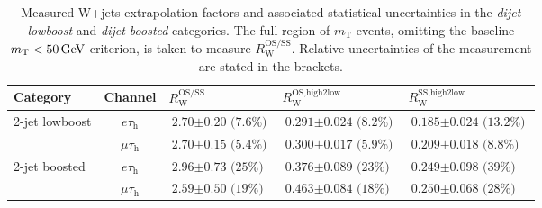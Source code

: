 \begin{table}[h!]
    \centering
    \caption[Measured W+jets extrapolation factors and associated statistical uncertainties in the \textit{dijet lowboost} and \textit{dijet boosted} categories.]{Measured W+jets extrapolation factors and associated statistical uncertainties in the \textit{dijet lowboost} and \textit{dijet boosted} categories. The full region of $m_\text{T}$ events, omitting the baseline $m_\text{T}<\text{50\,GeV}$ criterion, is taken to measure $R_\text{W}^\text{OS/SS}$.
    Relative uncertainties of the measurement are stated in the brackets.}\label{tab:etmt_wj:wj_factors_2jet}
    \begin{tabular}{lclll}
        \toprule
         Category                       & Channel    & $R_\text{W}^\text{OS/SS}$          & $R_\text{W}^\text{OS,high2low}$ & $R_\text{W}^\text{SS,high2low}$   \\ \hline
        \multirow{2}{*}{2-jet lowboost} & $e\tau_\text{h}$   & {\footnotesize $\text{2.70} \pm \text{0.20 (7.6\%)}$}  &  {\footnotesize $\text{0.291} \pm \text{0.024 (8.2\%)}$ }       &{\footnotesize $\text{0.185} \pm \text{0.024 (13.2\%)}$}    \\
                                        & $\mu\tau_\text{h}$ & {\footnotesize $\text{2.70} \pm \text{0.15 (5.4\%)}$}  &  {\footnotesize $\text{0.300} \pm \text{0.017 (5.9\%)}$ }      & {\footnotesize $\text{0.209} \pm \text{0.018 (8.8\%)}$ }          \\
        \multirow{2}{*}{2-jet boosted}  & $e\tau_\text{h}$   & {\footnotesize $\text{2.96} \pm \text{0.73 (25\%)}$ }  &  {\footnotesize $\text{0.376} \pm \text{0.089 (23\%)}$  }      & {\footnotesize $\text{0.249} \pm \text{0.098 (39\%)}$  } \\
                                        & $\mu\tau_\text{h}$ & {\footnotesize $\text{2.59} \pm \text{0.50 (19\%)}$ }  &  {\footnotesize $\text{0.463} \pm \text{0.084 (18\%)}$  }      & {\footnotesize $\text{0.250} \pm \text{0.068 (28\%)}$  } \\
    \end{tabular}%
\end{table}%

